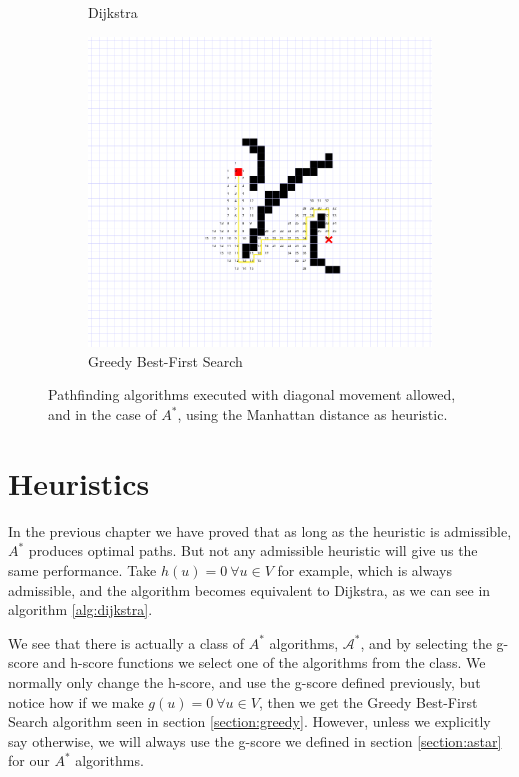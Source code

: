 \documentclass[12pt]{report}
\begin{document}
\begin{figure}
\begin{subfigure}[b]{0.45\textwidth}
	\caption{Dijkstra}
\end{subfigure}
\begin{subfigure}[b]{0.45\textwidth}
	\includegraphics[width=1\linewidth]{greedy-nodes}
	\caption{Greedy Best-First Search}
\end{subfigure}
\caption{Pathfinding algorithms executed with diagonal movement allowed, and in the case of $A^*$, using the Manhattan distance as heuristic.}
\label{fig:node-expansion}
\end{figure}


\chapter{Heuristics}
In the previous chapter we have proved that as long as the heuristic is admissible, $A^*$ produces optimal paths. But not any admissible heuristic will give us the same performance. Take $h(u) = 0 \  \forall u \in V$ for example, which is always admissible, and the algorithm becomes equivalent to Dijkstra, as we can see in algorithm \ref{alg:dijkstra}.

We see that there is actually a class of $A^*$ algorithms, $\mathcal{A^*}$, and by selecting the g-score and h-score functions we select one of the algorithms from the class. We normally only change the h-score, and use the g-score defined previously, but notice how if we make $g(u) = 0 \  \forall u \in V$, then we get the Greedy Best-First Search algorithm seen in section \ref{section:greedy}. However, unless we explicitly say otherwise, we will always use the g-score we defined in section \ref{section:astar} for our $A^*$ algorithms.
\end{document}
